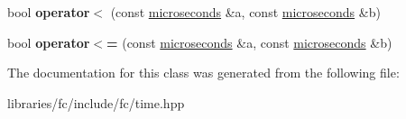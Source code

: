 \begin{DoxyCompactItemize}
\item 
\mbox{\label{classfc_1_1microseconds_aa1877d2e6b18621502415bb755c51108}} 
bool {\bfseries operator$<$} (const \mbox{\hyperlink{classfc_1_1microseconds}{microseconds}} \&a, const \mbox{\hyperlink{classfc_1_1microseconds}{microseconds}} \&b)
\item 
\mbox{\label{classfc_1_1microseconds_a01d844cd1e5a8b2108b564ac3b1a8ed4}} 
bool {\bfseries operator$<$=} (const \mbox{\hyperlink{classfc_1_1microseconds}{microseconds}} \&a, const \mbox{\hyperlink{classfc_1_1microseconds}{microseconds}} \&b)
\end{DoxyCompactItemize}


The documentation for this class was generated from the following file\+:\begin{DoxyCompactItemize}
\item 
libraries/fc/include/fc/time.\+hpp\end{DoxyCompactItemize}
